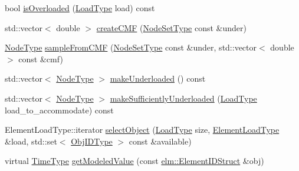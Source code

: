 \begin{DoxyCompactItemize}
\item 
bool \hyperlink{structvt_1_1vrt_1_1collection_1_1lb_1_1_tempered_l_b_ab737fad35804f7a6db9ae67a7a5fa982}{is\+Overloaded} (\hyperlink{structvt_1_1vrt_1_1collection_1_1lb_1_1_base_l_b_a215e22b9f12678303f49615ae3be05cc}{Load\+Type} load) const
\item 
std\+::vector$<$ double $>$ \hyperlink{structvt_1_1vrt_1_1collection_1_1lb_1_1_tempered_l_b_add46961d85ddad906cfd66aba09a0bd1}{create\+C\+MF} (\hyperlink{structvt_1_1vrt_1_1collection_1_1lb_1_1_tempered_l_b_aa18a0edaf10119e307e7209371caa673}{Node\+Set\+Type} const \&under)
\item 
\hyperlink{namespacevt_a866da9d0efc19c0a1ce79e9e492f47e2}{Node\+Type} \hyperlink{structvt_1_1vrt_1_1collection_1_1lb_1_1_tempered_l_b_a674736589bb2c1cadba7516e0bf598b9}{sample\+From\+C\+MF} (\hyperlink{structvt_1_1vrt_1_1collection_1_1lb_1_1_tempered_l_b_aa18a0edaf10119e307e7209371caa673}{Node\+Set\+Type} const \&under, std\+::vector$<$ double $>$ const \&cmf)
\item 
std\+::vector$<$ \hyperlink{namespacevt_a866da9d0efc19c0a1ce79e9e492f47e2}{Node\+Type} $>$ \hyperlink{structvt_1_1vrt_1_1collection_1_1lb_1_1_tempered_l_b_af3c49d726cab946d817f87ee94b417a2}{make\+Underloaded} () const
\item 
std\+::vector$<$ \hyperlink{namespacevt_a866da9d0efc19c0a1ce79e9e492f47e2}{Node\+Type} $>$ \hyperlink{structvt_1_1vrt_1_1collection_1_1lb_1_1_tempered_l_b_a946bd9c5a6591f8494ecd11be5092ef0}{make\+Sufficiently\+Underloaded} (\hyperlink{structvt_1_1vrt_1_1collection_1_1lb_1_1_base_l_b_a215e22b9f12678303f49615ae3be05cc}{Load\+Type} load\+\_\+to\+\_\+accommodate) const
\item 
Element\+Load\+Type\+::iterator \hyperlink{structvt_1_1vrt_1_1collection_1_1lb_1_1_tempered_l_b_a191c3b0d3f7a06de4510b1c3370eabc2}{select\+Object} (\hyperlink{structvt_1_1vrt_1_1collection_1_1lb_1_1_base_l_b_a215e22b9f12678303f49615ae3be05cc}{Load\+Type} size, \hyperlink{structvt_1_1vrt_1_1collection_1_1lb_1_1_base_l_b_aa286d31a0820a8fc9218ccb858368fca}{Element\+Load\+Type} \&load, std\+::set$<$ \hyperlink{structvt_1_1vrt_1_1collection_1_1lb_1_1_base_l_b_a790b22acf448880599724749cdc4e9b3}{Obj\+I\+D\+Type} $>$ const \&available)
\item 
virtual \hyperlink{namespacevt_a876a9d0cd5a952859c72de8a46881442}{Time\+Type} \hyperlink{structvt_1_1vrt_1_1collection_1_1lb_1_1_tempered_l_b_af0068125a6548e98f45142a736a0742c}{get\+Modeled\+Value} (const \hyperlink{structvt_1_1elm_1_1_element_i_d_struct}{elm\+::\+Element\+I\+D\+Struct} \&obj)

\end{DoxyCompactItemize}
